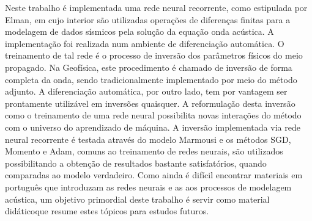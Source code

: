

Neste trabalho é implementada uma rede neural recorrente, como estipulada por Elman, em cujo interior são utilizadas operações de diferenças finitas para a modelagem de dados sísmicos pela solução da equação \DIFaddbegin {}\DIFaddend onda acústica. A implementação foi realizada num ambiente de diferenciação automática. O treinamento de tal rede é o processo de inversão dos parâmetros físicos do meio propagado. Na Geofísica, este procedimento é chamado de inversão de forma completa da onda, sendo tradicionalmente implementado por meio do método adjunto. A diferenciação automática, por outro lado, tem por vantagem ser prontamente utilizável em inversões quaisquer. A reformulação desta inversão como o treinamento de uma rede neural possibilita novas interações do método com o universo do aprendizado de máquina. A inversão implementada via rede neural recorrente é testada através do modelo Marmousi e os métodos SGD, Momento e Adam, comuns ao treinamento de redes neurais, são utilizados possibilitando a obtenção de resultados bastante satisfatórios, quando comparadas ao modelo verdadeiro. Como ainda é difícil encontrar materiais em português que introduzam as redes neurais e as \DIFdelbegin {}\DIFdelend \DIFaddbegin {}\DIFaddend aos processos de modelagem acústica, um objetivo primordial deste trabalho é servir como material didático\DIFaddbegin \DIFadd{, }\DIFaddend que resume estes tópicos para estudos futuros.
